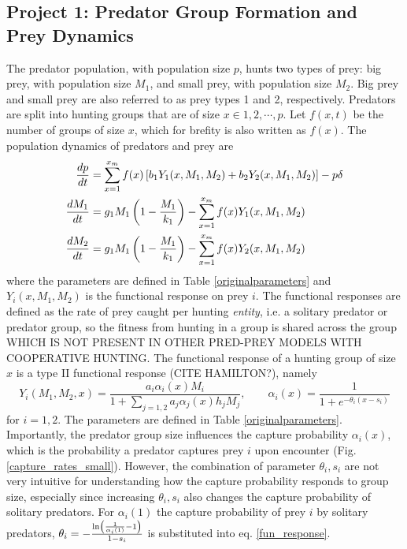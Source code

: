 \subsection{Project 1: Predator Group Formation and Prey Dynamics}
The predator population, with population size $p$, hunts two types of prey: big prey, with population size $M_1$, and small prey, with population size $M_2$. Big prey and small prey are also referred to as prey types 1 and 2, respectively. Predators are split into hunting groups that are of size $x \in 1, 2, \cdots, p$. Let $f(x,t)$ be the number of groups of size $x$, which for brefity is also written as $f(x)$. The population dynamics of predators and prey are 
\begin{subequations} \label{general_model}
\begin{align}
\frac{dp}{dt} &=  \sum_{x=1}^{x_{m}} f(x) \left[ b_1 Y_1(x,M_1,M_2) + b_2 Y_2(x,M_1,M_2) \right] - p \delta \\
\frac{dM_1}{dt} &= g_1 M_1 \left( 1 - \frac{M_1}{k_1} \right)  -  \sum_{x=1}^{x_{m}} f(x) Y_1(x,M_1,M_2) \\
\frac{dM_2}{dt} &= g_1 M_1 \left( 1 - \frac{M_1}{k_1} \right)  -  \sum_{x=1}^{x_{m}} f(x) Y_2(x,M_1,M_2)
\end{align}
\end{subequations}
where the parameters are defined in Table \ref{originalparameters} and $Y_i(x,M_1,M_2)$ is the functional response on prey $i$. The functional responses are defined as the rate of prey caught per hunting \textit{entity}, i.e. a solitary predator or predator group, so the fitness from hunting in a group is shared across the group WHICH IS NOT PRESENT IN OTHER PRED-PREY MODELS WITH COOPERATIVE HUNTING. The functional response of a hunting group of size $x$ is a type II functional response (CITE HAMILTON?), namely
\begin{equation} \label{fun_response}
Y_i(M_1, M_2, x) = \frac{a_i \alpha_i(x) M_i}{1 + \sum_{j=1,2} a_j \alpha_j(x) h_j M_j}, \qquad \alpha_i(x) = \frac{1}{1 + e^{-\theta_i(x - s_i)}}
\end{equation}	
for $i = 1,2$. The parameters are defined in Table \ref{originalparameters}. Importantly, the predator group size influences the capture probability $\alpha_i(x)$, which is the probability a predator captures prey $i$ upon encounter (Fig. \ref{capture_rates_small}). However, the combination of parameter $\theta_i, s_i$ are not very intuitive for understanding how the capture probability responds to group size, especially since increasing $\theta_i, s_i$ also changes the capture probability of solitary predators. For $\alpha_{i}(1)$ the capture probability of prey $i$ by solitary predators, $\theta_i = - \frac{\ln\left(  \frac{1}{\alpha_i(1)} -1  \right)}{1 - s_i}$ is substituted into eq. \ref{fun_response}.

